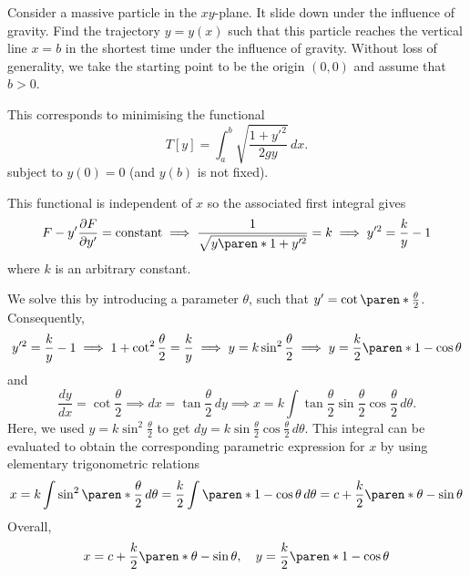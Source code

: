 \documentclass[11pt]{penrose}
\begin{document}
\begin{negg}
    Consider a massive particle in the $xy$-plane. It slide down under the influence of gravity. Find the trajectory $y=y(x)$ such that this particle reaches the vertical line $x=b$ in the shortest time under the influence of gravity. Without loss of generality, we take the starting point to be the origin $(0,0)$ and assume that $b > 0$.

    This corresponds to minimising the functional
    \begin{equation}
        T[y] = \int_{a}^{b} \sqrt{\frac{1 + y'^2}{2 g y}} \,dx.
    \end{equation}
    subject to $y(0)=0$ (and $y(b)$ is not fixed).

    This functional is independent of $x$ so the associated first integral gives
    \begin{equation}
        F - y' \frac{\pd F}{\pd y'} = \text{constant}
        \implies
        \frac{1}{ \sqrt{y \paren*{1 + y'^2}} } = k
        \implies
        y'^2 = \frac{k}{y} - 1
    \end{equation}
    where $k$ is an arbitrary constant.

    We solve this by introducing a parameter $\theta$, such that $y' = \cot\paren*{\frac{\theta}{2}}$. Consequently,
    \begin{equation}
        y'^2 = \frac{k}{y} - 1
        \implies
        1 + \cot^2 \frac{\theta}{2} = \frac{k}{y}
        \implies
        y = k \sin^2 \frac{\theta}{2}
        \implies
        y = \frac{k}{2} \paren*{1 - \cos\theta}
    \end{equation}
    and
    \begin{equation}
        \frac{dy}{dx} = \cot\frac{\theta}{2}
        \implies
        dx = \tan\frac{\theta}{2} \,dy
        \implies
        x = k \int \tan\frac{\theta}{2} \sin\frac{\theta}{2} \cos\frac{\theta}{2}\,d\theta.
    \end{equation}
    Here, we used $y = k \sin^2 \frac{\theta}{2}$ to get $dy = k \sin\frac{\theta}{2} \cos\frac{\theta}{2} \,d\theta$. This integral can be evaluated to obtain the corresponding parametric expression  for $x$ by using elementary trigonometric relations
    \begin{equation}
        x
        = k \int \sin^2 \paren*{\frac{\theta}{2}} \,d\theta
        = \frac{k}{2} \int \paren*{1 - \cos\theta} \,d\theta
        = c + \frac{k}{2} \paren*{\theta - \sin\theta}
    \end{equation}
    Overall,
    \begin{equation}
        x = c + \frac{k}{2} \paren*{\theta - \sin\theta},
        \quad
        y = \frac{k}{2} \paren*{1 - \cos\theta}
    \end{equation}


\end{negg}
\end{document}
